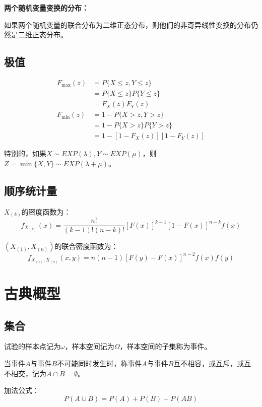 \documentclass[a4paper,12pt]{ctexart}
\begin{document}
\textbf{两个随机变量变换的分布：}

如果两个随机变量的联合分布为二维正态分布，则他们的非奇异线性变换的分布仍然是二维正态分布。

\subsection{极值}

\begin{align*}
	F_{\text{max}}(z) &= P\{X \leq z,Y \leq z\} \\
	&= P\{X \leq z\}P\{Y \leq z\} \\
	&= F_X(z)F_Y(z) \\
	F_{\text{min}}(z) &= 1 - P\{X > z,Y > z\} \\
	&= 1 - P\{X > z\}P\{Y > z\} \\
	&= 1 - [1 - F_X(z)][1 - F_Y(z)]
\end{align*}

特别的，如果$X \sim EXP(\lambda), Y \sim EXP(\mu)$，则$Z = \min\{X,Y\} \sim EXP(\lambda + \mu)$。

\subsection{顺序统计量}

$X_{(k)}$的密度函数为：
\begin{equation*}
	f_{X_{(k)}}(x) = \frac{n!}{(k-1)!(n-k)!}[F(x)]^{k-1}[1-F(x)]^{n-k}f(x)
\end{equation*}

$(X_{(1)},X_{(n)})$的联合密度函数为：
\begin{equation*}
	f_{X_{(1)},X_{(n)}}(x,y) = n(n-1)[F(y) - F(x)]^{n-2}f(x)f(y)
\end{equation*}

\section{古典概型}

\subsection{集合}

试验的样本点记为$\omega$，样本空间记为$\Omega$，样本空间的子集称为事件。

当事件$A$与事件$B$不可能同时发生时，称事件$A$与事件$B$互不相容，或互斥，或互不相交，记为$A \cap B = \emptyset$。

加法公式：
\begin{equation*}
	P(A\cup B) = P(A) + P(B) - P(AB)
\end{equation*}
\end{document}
